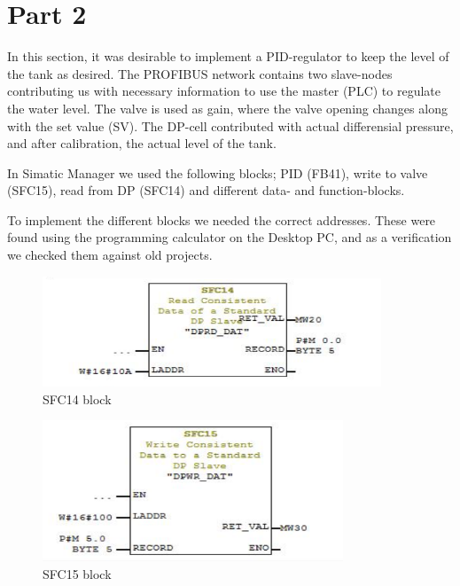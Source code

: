 \section{Part 2}
In this section, it was desirable to implement a PID-regulator to keep the level of the tank as desired. The PROFIBUS network contains two slave-nodes contributing us with necessary information to use the master (PLC) to regulate the water level. The valve is used as gain, where the valve opening changes along with the set value (SV). The DP-cell contributed with actual differensial pressure, and after calibration, the actual level of the tank.

In Simatic Manager we used the following blocks; PID (FB41), write to valve (SFC15), read from DP (SFC14) and different data- and function-blocks.

To implement the different blocks we needed the correct addresses. These were found using the programming calculator on the Desktop PC, and as a verification we checked them against old projects.

\begin{figure}[!htb]
    \centering
    \includegraphics[width=0.9\textwidth]{images/bilde2}
    \caption{SFC14 block}
\end{figure}

\begin{figure}[!htb]
    \centering
    \includegraphics[width=0.8\textwidth]{images/bilde3}
    \caption{SFC15 block}
\end{figure}